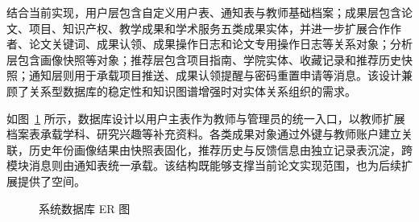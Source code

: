 \documentclass[12pt,a4paper]{ctexbook}
\begin{document}
结合当前实现，用户层包含自定义用户表、通知表与教师基础档案；成果层包含论文、项目、知识产权、教学成果和学术服务五类成果实体，并进一步扩展合作作者、论文关键词、成果认领、成果操作日志和论文专用操作日志等关系对象；分析层包含画像快照等对象；推荐层包含项目指南、学院实体、收藏记录和推荐历史快照；通知层则用于承载项目推送、成果认领提醒与密码重置申请等消息。该设计兼顾了关系型数据库的稳定性和知识图谱增强时对实体关系组织的需求\cite{kg_general_survey}\cite{academic_kg_service_2018}。

如图~\ref{fig:database-er} 所示，数据库设计以用户主表作为教师与管理员的统一入口，以教师扩展档案表承载学科、研究兴趣等补充资料。各类成果对象通过外键与教师账户建立关联，历史年份画像结果由快照表固化，推荐历史与反馈信息由独立记录表沉淀，跨模块消息则由通知表统一承载。该结构既能够支撑当前论文实现范围，也为后续扩展提供了空间。

\begin{figure}[H]
  \centering
  
  \caption{系统数据库 ER 图}
  \label{fig:database-er}
\end{figure}
\end{document}
